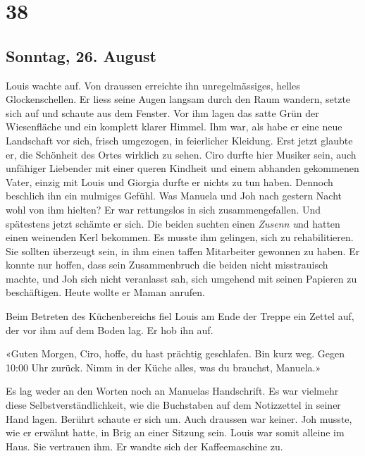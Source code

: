 \chapter{38}

\section{Sonntag, 26. August}



Louis wachte auf. Von draussen erreichte ihn unregelmässiges, helles Glockenschellen. 
Er liess seine Augen langsam durch den Raum wandern, setzte sich auf und schaute aus dem
Fenster. Vor ihm lagen das satte Grün der Wiesenfläche und ein
komplett klarer Himmel. Ihm war, als habe er eine neue
Landschaft vor sich, frisch umgezogen, in feierlicher Kleidung. Erst
jetzt glaubte er, die Schönheit des Ortes wirklich zu sehen.
Ciro durfte hier Musiker sein, auch unfähiger Liebender mit einer
queren Kindheit und einem abhanden gekommenen Vater, einzig mit Louis und
Giorgia durfte er nichts zu tun haben.
Dennoch beschlich ihn ein mulmiges Gefühl. Was Manuela und Joh nach
gestern Nacht wohl von ihm hielten? Er war rettungslos in sich
zusammengefallen. Und spätestens jetzt schämte er sich. Die beiden
suchten einen \emph{Zusenn u}nd hatten einen weinenden Kerl bekommen. Es
musste ihm gelingen, sich zu rehabilitieren. Sie sollten überzeugt sein,
in ihm einen taffen Mitarbeiter gewonnen zu haben. Er konnte nur hoffen, dass sein Zusammenbruch die beiden nicht misstrauisch machte, und Joh sich nicht veranlasst sah, sich umgehend mit seinen Papieren zu beschäftigen. 
Heute wollte er Maman anrufen.

\sectionbreak

Beim Betreten des Küchenbereichs fiel Louis am Ende der Treppe ein
Zettel auf, der vor ihm auf dem Boden lag. Er hob ihn auf.

«Guten Morgen, Ciro, hoffe, du hast prächtig geschlafen. Bin kurz weg.
Gegen 10:00 Uhr zurück. Nimm in der Küche alles, was du brauchst,
Manuela.»

Es lag weder an den Worten noch an Manuelas Handschrift. Es war vielmehr
diese Selbstverständlichkeit, wie die Buchstaben auf dem Notizzettel
in seiner Hand lagen. Berührt schaute er sich um. Auch draussen war
keiner. Joh musste, wie er erwähnt hatte, in Brig an einer Sitzung sein.
Louis war somit alleine im Haus.
Sie vertrauen ihm. 
Er wandte sich der Kaffeemaschine zu. 

